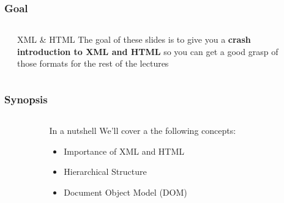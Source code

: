 \documentclass{beamer}\usepackage[]{graphicx}\usepackage[]{color}
\begin{document}
\begin{frame}
\frametitle{Goal}

\begin{columns}[t]
\begin{column}{0.1\textwidth}
\end{column}
\begin{column}{0.8\textwidth}

\begin{block}{XML \& HTML}
The goal of these slides is to give you a \textbf{crash introduction to XML and HTML} so you can get a good grasp of those formats for the rest of the lectures
\end{block}

\end{column}
\begin{column}{0.1\textwidth}
\end{column}
\end{columns}

\end{frame}


\begin{frame}
\frametitle{Synopsis}

\begin{columns}[t]
\begin{column}{0.1\textwidth}
\end{column}
\begin{column}{0.8\textwidth}

\begin{block}{In a nutshell}
We'll cover a the following concepts:
\begin{itemize}
 \item Importance of XML and HTML
 \item Hierarchical Structure
 \item Document Object Model (DOM)
\end{itemize}
\end{block}

\end{column}
\begin{column}{0.1\textwidth}
\end{column}
\end{columns}

\end{frame}

\end{document}
